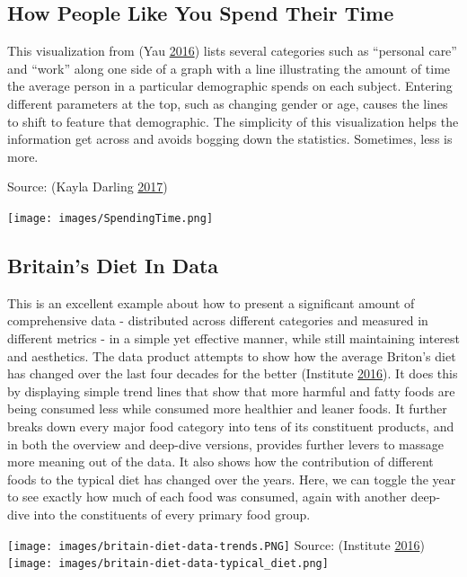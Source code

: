 \documentclass[]{book}
\begin{document}
\hypertarget{how-people-like-you-spend-their-time}{%
\subsection{How People Like You Spend Their Time}\label{how-people-like-you-spend-their-time}}

This visualization from (Yau \protect\hyperlink{ref-spendingtime}{2016}) lists several categories such as ``personal care'' and ``work'' along one side of a graph with a line illustrating the amount of time the average person in a particular demographic spends on each subject. Entering different parameters at the top, such as changing gender or age, causes the lines to shift to feature that demographic. The simplicity of this visualization helps the information get across and avoids bogging down the statistics. Sometimes, less is more.

Source: (Kayla Darling \protect\hyperlink{ref-cool_data}{2017})

\texttt{[image: images/SpendingTime.png]}

\hypertarget{britains-diet-in-data}{%
\subsection{Britain's Diet In Data}\label{britains-diet-in-data}}

This is an excellent example about how to present a significant amount of comprehensive data - distributed across different categories and measured in different metrics - in a simple yet effective manner, while still maintaining interest and aesthetics. The data product attempts to show how the average Briton's diet has changed over the last four decades for the better (Institute \protect\hyperlink{ref-britain_diet_2016}{2016}). It does this by displaying simple trend lines that show that more harmful and fatty foods are being consumed less while consumed more healthier and leaner foods. It further breaks down every major food category into tens of its constituent products, and in both the overview and deep-dive versions, provides further levers to massage more meaning out of the data. It also shows how the contribution of different foods to the typical diet has changed over the years. Here, we can toggle the year to see exactly how much of each food was consumed, again with another deep-dive into the constituents of every primary food group.

\texttt{[image: images/britain-diet-data-trends.PNG]}
Source: (Institute \protect\hyperlink{ref-britain_diet_2016}{2016})
\texttt{[image: images/britain-diet-data-typical\_diet.png]}
\end{document}
